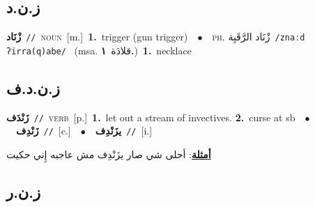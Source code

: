 \documentclass[10pt,a4paper,twoside]{article} %
\begin{document}
\begin{multicols}{2}
\vspace{-3mm}
\subsection*{\color{blue}\foreignlanguage{arabic}{ز.ن.د}\color{blue}{}} 

{\setlength\topsep{0pt}\textbf{\foreignlanguage{arabic}{زْنَاد}}\ {\color{gray}\texttt{//}\color{black}}\ \textsc{noun}\ [m.]\ \textbf{1.}~trigger (gun trigger)\ \ $\bullet$\ \ \textsc{ph.} \color{gray} \foreignlanguage{arabic}{زْنَاد الرَّقَبِة}\color{black}\ {\color{gray}\texttt{/{\sffamily znaːd ʔirra(q)abe}/}\color{black}}\ \color{gray} (msa. \foreignlanguage{arabic}{قلادَة}~\foreignlanguage{arabic}{\textbf{١.}})\color{black}\ \textbf{1.}~necklace\ } \vspace{2mm}

\vspace{-3mm}
\subsection*{\color{blue}\foreignlanguage{arabic}{ز.ن.د.ف}\color{blue}{}} 

{\setlength\topsep{0pt}\textbf{\foreignlanguage{arabic}{زَنْدَف}}\ {\color{gray}\texttt{//}\color{black}}\ \textsc{verb}\ [p.]\ \textbf{1.}~let out a stream of invectives.  \textbf{2.}~curse at sb\ \ $\bullet$\ \ \setlength\topsep{0pt}\textbf{\foreignlanguage{arabic}{زَنْدِف}}\ {\color{gray}\texttt{//}\color{black}}\ [c.]\ \ $\bullet$\ \ \setlength\topsep{0pt}\textbf{\foreignlanguage{arabic}{يزَنْدِف}}\ {\color{gray}\texttt{//}\color{black}}\ [i.]\  \begin{flushright}\color{gray}\foreignlanguage{arabic}{\textbf{\underline{\foreignlanguage{arabic}{أمثلة}}}: أحلى شي صار يزَنْدِف مش عاجبه إِني حكيت}\end{flushright}\color{black}} \vspace{2mm}

\vspace{-3mm}
\subsection*{\color{blue}\foreignlanguage{arabic}{ز.ن.ر}\color{blue}{}} 


\end{multicols}
\end{document}
